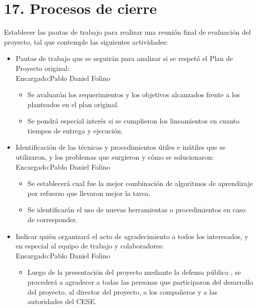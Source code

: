\documentclass[11pt]{charter}
\begin{document}
\vspace{40mm}


\section{17. Procesos de cierre}    
\label{sec:cierre}

Establecer las pautas de trabajo para realizar una reunión final de evaluación del proyecto, tal que contemple las siguientes actividades:

\begin{itemize}
\item Pautas de trabajo que se seguirán para analizar si se respetó el Plan de Proyecto original:\\
Encargado:Pablo Daniel Folino
	\begin{itemize}
	\item Se avaluarán los requerimientos y los objetivos alcanzados frente a los planteados en el plan original.
	\item Se pondrá especial interés si se cumplieron los lineamientos en cuanto tiempos de entrega y ejecución.
	\end{itemize}	
\item Identificación de las técnicas y procedimientos útiles e inútiles que se utilizaron, y los problemas que surgieron y cómo se solucionaron:\\
Encargado:Pablo Daniel Folino
	\begin{itemize}
	\item Se establecerá cual fue la mejor combinación de algoritmos de aprendizaje por refuerzo que llevaron mejor la tarea.
	\item Se identificarán el uso de nuevas herramientas o procedimientos en caso de corresponder.
	\end{itemize}
\item Indicar quién organizará el acto de agradecimiento a todos los interesados, y en especial al equipo de trabajo y colaboradores:\\
Encargado:Pablo Daniel Folino
	\begin{itemize}
	\item Luego de la presentación del proyecto mediante la defensa pública , se procederá a agradecer a todas las personas que participaron del desarrollo del proyecto, al director del proyecto, a los compañeros y a las autoridades del CESE.
	\end{itemize}
\end{itemize}

\end{document}

